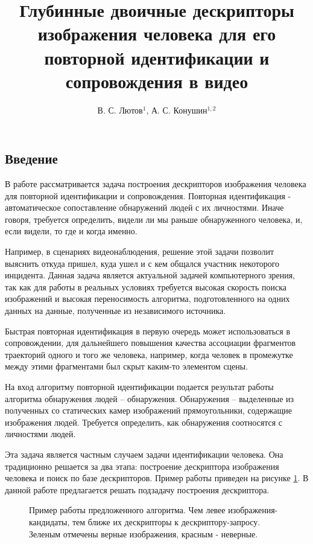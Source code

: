 \documentclass[a4paper]{article}
\title{Глубинные двоичные дескрипторы изображения человека для его повторной идентификации и сопровождения в видео}
\author{В. С. Лютов$^1$, А. С. Конушин$^{1,2}$}
\begin{document}
\maketitle

\begin{multicols*}{2}

\section{Введение}

В работе рассматривается задача построения дескрипторов изображения человека для повторной идентификации и сопровождения. Повторная идентификация - автоматическое сопоставление обнаружений людей с их личностями. Иначе говоря, требуется определить, видели ли мы раньше обнаруженного человека, и, если видели, то где и когда именно.

Например, в сценариях видеонаблюдения, решение этой задачи позволит выяснить откуда пришел, куда ушел и с кем общался участник некоторого инцидента. Данная задача является актуальной задачей компьютерного зрения, так как для работы в реальных условиях требуется высокая скорость поиска изображений и высокая переносимость алгоритма, подготовленного на одних данных на данные, полученные из независимого источника.

Быстрая повторная идентификация в первую очередь может использоваться в сопровождении, для дальнейшего повышения качества ассоциации фрагментов траекторий одного и того же человека, например, когда человек в промежутке между этими фрагментами был скрыт каким-то элементом сцены\cite{tracking}.

На вход алгоритму повторной идентификации подается результат работы алгоритма обнаружения людей -- обнаружения. Обнаружения -- выделенные из полученных со статических камер изображений прямоугольники, содержащие изображения людей. Требуется определить, как обнаружения соотносятся с личностями людей.

Эта задача является частным случаем задачи идентификации человека. Она традиционно решается за два этапа: построение дескриптора изображения человека и поиск по базе дескрипторов\cite{review1}. Пример работы приведен на рисунке \ref{rankexample}. В данной работе предлагается решать подзадачу построения дескриптора.

\begin{figure}[H]
    \caption{Пример работы предложенного алгоритма. Чем левее изображения-кандидаты, тем ближе их дескрипторы к дескриптору-запросу. Зеленым отмечены верные изображения, красным - неверные.}
    \label{rankexample}
\end{figure}


\end{multicols*}
\end{document}
